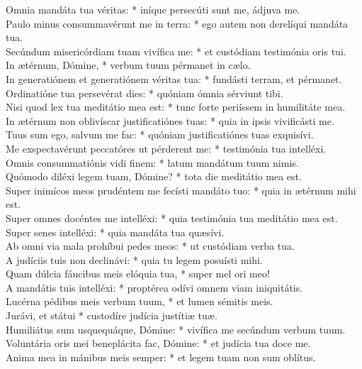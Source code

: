{	Omnia mandáta tua véritas: * iníque persecúti sunt me, ádjuva me. \\
	Paulo minus consummavérunt me in terra: * ego autem non derelíqui mandáta tua. \\
	Secúndum misericórdiam tuam vivífica me: * et custódiam testimónia oris tui. \\
	In ætérnum, Dómine, * verbum tuum pérmanet in cælo. \\
	In generatiónem et generatiónem véritas tua: * fundásti terram, et pérmanet. \\
	Ordinatióne tua persevérat dies: * quóniam ómnia sérviunt tibi. \\
	Nisi quod lex tua meditátio mea est: * tunc forte periíssem in humilitáte mea. \\
	In ætérnum non oblivíscar justificatiónes tuas: * quia in ipsis vivificásti me. \\
	Tuus sum ego, salvum me fac: * quóniam justificatiónes tuas exquisívi. \\
	Me exspectavérunt peccatóres ut pérderent me: * testimónia tua intelléxi. \\
	Omnis consummatiónis vidi finem: * latum mandátum tuum nimis. \\
	Quómodo diléxi legem tuam, Dómine? * tota die meditátio mea est. \\
	Super inimícos meos prudéntem me fecísti mandáto tuo: * quia in ætérnum mihi est. \\
	Super omnes docéntes me intelléxi: * quia testimónia tua meditátio mea est. \\
	Super senes intelléxi: * quia mandáta tua quæsívi. \\
	Ab omni via mala prohíbui pedes meos: * ut custódiam verba tua. \\
	A judíciis tuis non declinávi: * quia tu legem posuísti mihi. \\
	Quam dúlcia fáucibus meis elóquia tua, * super mel ori meo! \\
	A mandátis tuis intelléxi: * proptérea odívi omnem viam iniquitátis. \\
	Lucérna pédibus meis verbum tuum, * et lumen sémitis meis. \\
	Jurávi, et státui * custodíre judícia justítiæ tuæ. \\
	Humiliátus sum usquequáque, Dómine: * vivífica me secúndum verbum tuum. \\
	Voluntária oris mei beneplácita fac, Dómine: * et judícia tua doce me. \\
	Anima mea in mánibus meis semper: * et legem tuam non sum oblítus. \\
}

